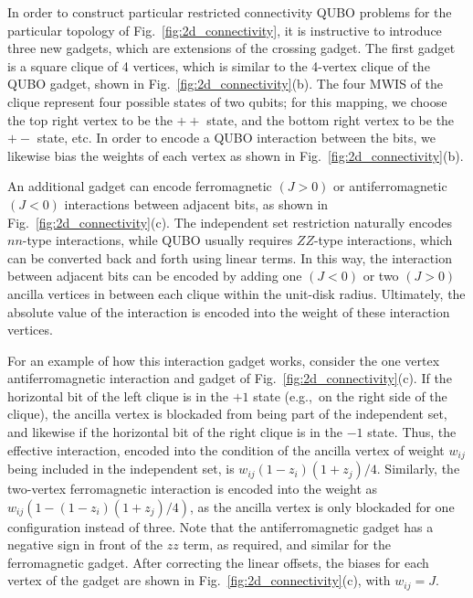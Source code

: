 In order to construct particular restricted connectivity QUBO problems for the particular topology of Fig.~\ref{fig:2d_connectivity}, it is instructive to introduce three new gadgets, which are extensions of the crossing gadget. The first gadget is a square clique of 4 vertices, which is similar to the 4-vertex clique of the QUBO gadget, shown in Fig.~\ref{fig:2d_connectivity}(b). The four MWIS of the clique represent four possible states of two qubits; for this mapping, we choose the top right vertex to be the $++$ state, and the bottom right vertex to be the $+-$ state, etc. In order to encode a QUBO interaction between the bits, we likewise bias the weights of each vertex as shown in Fig.~\ref{fig:2d_connectivity}(b).

An additional gadget can encode ferromagnetic $(J>0)$ or antiferromagnetic $(J<0)$ interactions between adjacent bits, as shown in Fig.~\ref{fig:2d_connectivity}(c). The independent set restriction naturally encodes $nn$-type interactions, while QUBO usually requires $ZZ$-type interactions, which can be converted back and forth using linear terms. In this way, the interaction between adjacent bits can be encoded by adding one $(J<0)$ or two $(J>0)$ ancilla vertices in between each clique within the unit-disk radius. Ultimately, the absolute value of the interaction is encoded into the weight of these interaction vertices. 

For an example of how this interaction gadget works, consider the one vertex antiferromagnetic interaction and gadget of Fig.~\ref{fig:2d_connectivity}(c). If the horizontal bit of the left clique is in the $+1$ state (e.g.,~on the right side of the clique), the ancilla vertex is blockaded from being part of the independent set, and likewise if the horizontal bit of the right clique is in the $-1$ state. Thus, the effective interaction, encoded into the condition of the ancilla vertex of weight $w_{ij}$ being included in the independent set, is $w_{ij}(1-z_i)(1+z_j)/4$. Similarly, the two-vertex ferromagnetic interaction is encoded into the weight as $w_{ij}(1-(1-z_i)(1+z_j)/4)$, as the ancilla vertex is only blockaded for one configuration instead of three. Note that the antiferromagnetic gadget has a negative sign in front of the $zz$ term, as required, and similar for the ferromagnetic gadget. After correcting the linear offsets, the biases for each vertex of the gadget are shown in Fig.~\ref{fig:2d_connectivity}(c), with $w_{ij} = J$.

